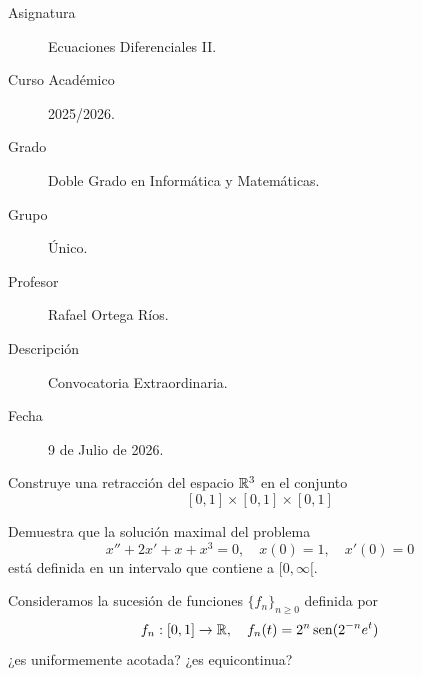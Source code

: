 \documentclass[12pt]{article}
\begin{document}

    
    

    \begin{description}
        \item[Asignatura] Ecuaciones Diferenciales II.
        \item[Curso Académico] 2025/2026.
        \item[Grado] Doble Grado en Informática y Matemáticas.
        \item[Grupo] Único.
        \item[Profesor] Rafael Ortega Ríos.
        \item[Descripción] Convocatoria Extraordinaria.
        \item[Fecha] 9 de Julio de 2026.
    
    \end{description}
    \newpage


    
    \begin{ejercicio}
        Construye una retracción del espacio $\mathbb{R}^3$ en el conjunto $$[0, 1] \times [0, 1] \times [0, 1]$$
    \end{ejercicio}

    \begin{ejercicio}
        Demuestra que la solución maximal del problema
        \[
        x'' + 2x' + x + x^3 = 0, \quad x(0) = 1, \quad x'(0) = 0
        \]
        está definida en un intervalo que contiene a $[0, \infty[$.
    \end{ejercicio}

    \begin{ejercicio}
        Consideramos la sucesión de funciones $\{f_n\}_{n \geq 0}$ definida por
        \[
        f_n : [0, 1] \to \mathbb{R}, \quad f_n(t) = 2^n \operatorname{sen}(2^{-n} e^t)
        \]
        ¿es uniformemente acotada? ¿es equicontinua?
    \end{ejercicio}
\end{document}
